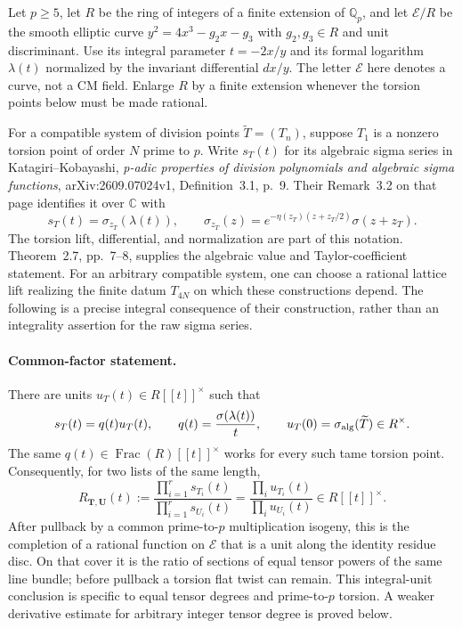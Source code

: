 \documentclass[11pt]{article}
\newcommand{\Q}{\mathbb Q}\newcommand{\C}{\mathbb C}\newcommand{\Z}{\mathbb Z}\newcommand{\R}{\mathbb R}\newcommand{\A}{\mathbb A}\newcommand{\OO}{\mathcal O}
\theoremstyle{definition}\newtheorem{definition}[theorem]{Definition}\newtheorem{remark}[theorem]{Remark}
\begin{document}
Let $p\geq5$, let $R$ be the ring of integers of a finite extension of
$\Q_p$, and let $\mathcal E/R$ be the smooth elliptic curve
$y^2=4x^3-g_2x-g_3$ with $g_2,g_3\in R$ and unit discriminant.
Use its integral parameter $t=-2x/y$ and its formal logarithm
$\lambda(t)$ normalized by the invariant differential $dx/y$.
The letter $\mathcal E$ here denotes a curve, not a CM field.
Enlarge $R$ by a finite extension whenever the torsion points below
must be made rational.

For a compatible system of division points $\widetilde T=(T_n)$,
suppose $T_1$ is a nonzero torsion point of order $N$ prime to $p$.
Write $s_T(t)$ for its algebraic sigma series in
Katagiri--Kobayashi, \emph{p-adic properties of division polynomials
and algebraic sigma functions}, arXiv:2609.07024v1,
Definition~3.1, p.~9. Their Remark~3.2 on that page identifies it over
$\C$ with
\[
 s_T(t)=\sigma_{z_T}(\lambda(t)),\qquad
 \sigma_{z_T}(z)=
 e^{-\eta(z_T)(z+z_T/2)}\sigma(z+z_T).
\]
The torsion lift, differential, and normalization are part of this
notation. Theorem~2.7, pp.~7--8, supplies the algebraic value and
Taylor-coefficient statement. For an arbitrary compatible system,
one can choose a rational lattice lift realizing the finite datum
$T_{4N}$ on which these constructions depend.
The following is a precise integral consequence of their
construction, rather than an integrality assertion for the raw sigma
series.

\paragraph{Common-factor statement.}
There are units $u_T(t)\in R[[t]]^\times$ such that
\begin{equation}\label{C18-factor}
 s_T(t)=q(t)u_T(t),\qquad
 q(t)=\frac{\sigma(\lambda(t))}{t},\qquad
 u_T(0)=\sigma_{\rm alg}(\widetilde T)\in R^\times.
\end{equation}
The same $q(t)\in\operatorname{Frac}(R)[[t]]^\times$ works for every
such tame torsion point. Consequently, for two lists of the same
length,
\begin{equation}\label{C18-ratio}
 R_{\mathbf T,\mathbf U}(t):=
 \frac{\prod_{i=1}^r s_{T_i}(t)}
      {\prod_{i=1}^r s_{U_i}(t)}
       =\frac{\prod_i u_{T_i}(t)}{\prod_i u_{U_i}(t)}
       \in R[[t]]^\times.
\end{equation}
After pullback by a common prime-to-$p$ multiplication isogeny,
this is the completion of a rational function on
$\mathcal E$ that is a unit along the identity residue disc.
On that cover it is the ratio of sections of equal tensor powers
of the same line bundle; before pullback a torsion flat twist can
remain. This integral-unit conclusion is specific to equal tensor
degrees and prime-to-$p$ torsion. A weaker derivative estimate for
arbitrary integer tensor degree is proved below.
\end{document}
